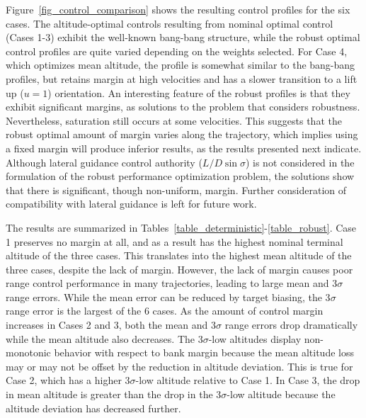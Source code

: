 Figure~\ref{fig_control_comparison} shows the resulting control profiles for the six cases. The altitude-optimal controls resulting from nominal optimal control (Cases 1-3) exhibit the well-known bang-bang structure, while the robust optimal control profiles are quite varied depending on the weights selected. For Case 4, which optimizes mean altitude, the profile is somewhat similar to the bang-bang profiles, but retains margin at high velocities and has a slower transition to a lift up ($u=1$) orientation. An interesting feature of the robust profiles is that they exhibit significant margins, as solutions to the problem that considers robustness. Nevertheless, saturation still occurs at some velocities. This suggests that the robust optimal amount of margin varies along the trajectory, which implies using a fixed margin will produce inferior results, as the results presented next indicate. Although lateral guidance control authority ($L/D \sin\sigma$) is not considered in the formulation of the robust performance optimization problem, the solutions show that there is significant, though non-uniform, margin. Further consideration of compatibility with lateral guidance is left for future work. 


The results are summarized in Tables~\ref{table_deterministic}-\ref{table_robust}. Case 1 preserves no margin at all, and as a result has the highest nominal terminal altitude of the three cases. This translates into the highest mean altitude of the three cases, despite the lack of margin. However, the lack of margin causes poor range control performance in many trajectories, leading to large mean and 3$\sigma$ range errors. While the mean error can be reduced by target biasing, the 3$\sigma$ range error is the largest of the 6 cases. As the amount of control margin increases in Cases 2 and 3, both the mean and 3$\sigma$ range errors drop dramatically while the mean altitude also decreases. The 3$\sigma$-low altitudes display non-monotonic behavior with respect to bank margin because the mean altitude loss may or may not be offset by the reduction in altitude deviation. This is true for Case 2, which has a higher 3$\sigma$-low altitude relative to Case 1. In Case 3, the drop in mean altitude is greater than the drop in the 3$\sigma$-low altitude because the altitude deviation has decreased further. 

